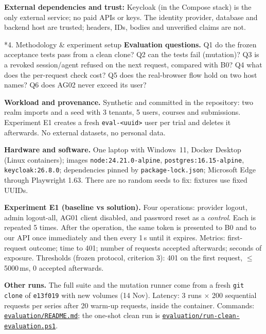 \documentclass[11pt]{article}
\makeatletter
\newcommand{\code}[1]{\texttt{\small #1}}
\newcommand{\repo}{https://github.com/krishnateja2314/iam-provider}
\newcommand{\gh}[2]{\href{\repo/blob/cs5903-final-2026/#1}{#2}}
\renewcommand\section{\@startsection{section}{1}{0pt}{-10pt plus -2pt}{4pt}{\large\bfseries}}
\makeatother
\begin{document}
\textbf{External dependencies and trust:} Keycloak (in the Compose stack) is the only external service; no paid APIs or keys. The identity provider, database and backend host are trusted; headers, IDs, bodies and unverified claims are not.

\section*{4. Methodology \& experiment setup}
\textbf{Evaluation questions.} Q1 do the frozen acceptance tests pass from a clean clone? Q2 can the tests fail (mutation)? Q3 is a revoked session/agent refused on the next request, compared with B0? Q4 what does the per-request check cost? Q5 does the real-browser flow hold on two host names? Q6 does AG02 never exceed its user?

\textbf{Workload and provenance.} Synthetic and committed in the repository: two realm imports and a seed with 3 tenants, 5 users, courses and submissions. Experiment E1 creates a fresh \code{eval-<uuid>} user per trial and deletes it afterwards. No external datasets, no personal data.

\textbf{Hardware and software.} One laptop with Windows~11, Docker Desktop (Linux containers); images \code{node:24.21.0-alpine}, \code{postgres:16.15-alpine}, \code{keycloak:26.8.0}; dependencies pinned by \code{package-lock.json}; Microsoft Edge through Playwright 1.63. There are no random seeds to fix: fixtures use fixed UUIDs.

\textbf{Experiment E1 (baseline vs solution).} Four operations: provider logout, admin logout-all, AG01 client disabled, and password reset as a \emph{control}. Each is repeated 5 times. After the operation, the same token is presented to B0 and to our API once immediately and then every 1\,s until it expires. Metrics: first-request outcome; time to 401; number of requests accepted afterwards; seconds of exposure. Thresholds (frozen protocol, criterion 3): 401 on the first request, $\le$\,5000\,ms, 0 accepted afterwards.

\textbf{Other runs.} The full suite and the mutation runner come from a fresh \code{git clone} of \texttt{e13f019} with new volumes (14 Nov). Latency: 3 runs $\times$ 200 sequential requests per series after 20 warm-up requests, inside the container. Commands: \gh{evaluation/README.md}{\code{evaluation/README.md}}; the one-shot clean run is \gh{evaluation/run-clean-evaluation.ps1}{\code{evaluation/run-clean-evaluation.ps1}}.
\end{document}
